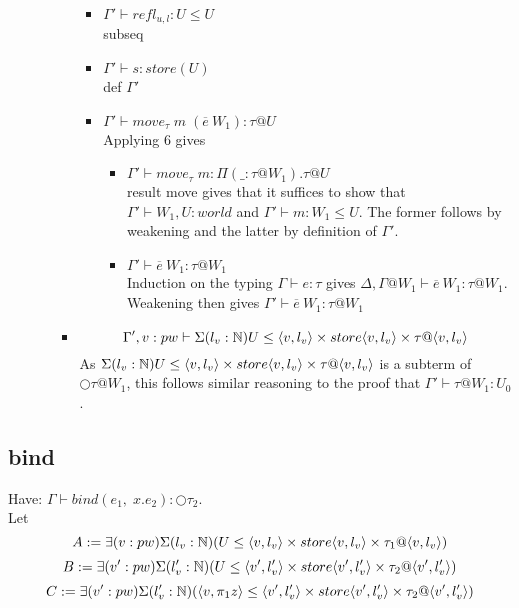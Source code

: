 \message{ !name(paper.tex)}\documentclass{article}
\begin{document}
\begin{itemize}
\begin{itemize}
\begin{itemize}
                 \begin{itemize}
                     \item $\Gamma' \vdash refl_{u, l} : U \leq U$\\
                     subseq
                     \item $\Gamma' \vdash s: store(U)$\\
                     def $\Gamma'$
                     \item $\Gamma' \vdash move_{\tau}\;m\;(\overline{e} \: W_1) : \tau @ U$\\
                     Applying 6 gives 
                     \begin{itemize}
                         \item $\Gamma' \vdash move_{\tau}\;m : \Pi(\_ : \tau @ W_1). \tau @ U$\\
                         result move gives that it suffices to show that $\Gamma' \vdash W_1, U : world$ and $\Gamma' \vdash m : W_1 \leq U$. The former follows by weakening and the latter by definition of $\Gamma'$.
                         \item $\Gamma' \vdash \overline{e} \: W_1 : \tau @ W_1$\\
                         Induction on the typing $\Gamma \vdash e : \tau$ gives $\Delta, \Gamma @ W_1 \vdash  \overline{e} \: W_1 : \tau @ W_1$. Weakening then gives $\Gamma' \vdash \overline{e} \: W_1 : \tau @ W_1$
                     \end{itemize}
                 \end{itemize}
          \item  \[\Gamma', v: pw \vdash \Sigma(l_v : \N)U \leq \langle v, l_v\rangle \times store\langle v, l_v\rangle \times \tau@\langle v, l_v\rangle\]
          As $\Sigma(l_v : \N)U \leq \langle v, l_v\rangle \times store\langle v, l_v\rangle \times \tau@\langle v, l_v\rangle$ is a subterm of $\bigcirc \tau @ W_1$, this follows similar reasoning to the proof that $\Gamma ' \vdash \tau @ W_1 : U_0$.
         \end{itemize}
     \end{itemize}
\end{itemize}

\subsection{bind}
Have: $\Gamma \vdash bind(e_1,\; x.e_2) : \bigcirc \tau_2$. \\
Let
\[A :=\exists(v: pw)\Sigma(l_v : \mathbb{N})(U \leq \langle v, l_v \rangle \times store\langle v, l_v \rangle \times \tau_1 @ \langle v, l_v \rangle)
\]
\[B :=\exists(v': pw)\Sigma(l_v' : \mathbb{N})(U \leq \langle v', l_v' \rangle \times store\langle v', l_v' \rangle \times \tau_2 @ \langle v', l_v' \rangle)
\]
\[C :=\exists(v': pw)\Sigma(l_v' : \mathbb{N})(\langle v, \pi_1 z \rangle \leq \langle v', l_v' \rangle \times store\langle v', l_v' \rangle \times \tau_2 @ \langle v', l_v' \rangle)
\]
\end{document}
